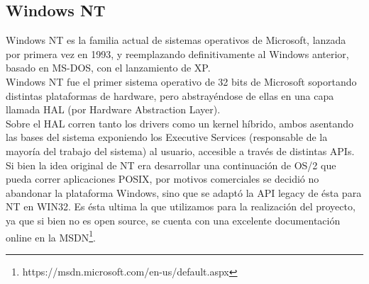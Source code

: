 \subsection{Windows NT}

Windows NT es la familia actual de sistemas operativos de Microsoft, lanzada
por primera vez en 1993, y reemplazando definitivamente al Windows anterior,
basado en MS-DOS, con el lanzamiento de XP.\\

Windows NT fue el primer sistema operativo de 32 bits de Microsoft soportando
distintas plataformas de hardware, pero abstrayéndose de ellas en una capa
llamada HAL (por Hardware Abstraction Layer).\\

Sobre el HAL corren tanto los drivers como un kernel híbrido, ambos asentando
las bases del sistema exponiendo los Executive Services (responsable de la
mayoría del trabajo del sistema) al usuario, accesible a través de distintas
APIs.\\

Si bien la idea original de NT era desarrollar una continuación de OS/2 que
pueda correr aplicaciones POSIX, por motivos comerciales se decidió no abandonar
la plataforma Windows, sino que se adaptó la API legacy de ésta para NT en
WIN32. Es ésta ultima la que utilizamos para la realización del proyecto, ya que
si bien no es open source, se cuenta con una excelente documentación online
en la MSDN\footnote{https://msdn.microsoft.com/en-us/default.aspx}.\\

